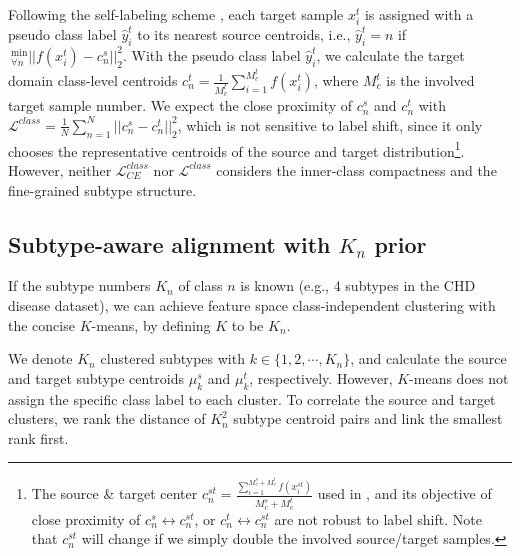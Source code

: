 Following the self-labeling scheme \cite{zou2019confidence,pan2019transferrable}, each target sample $x_i^t$ is assigned with a pseudo class label $\hat{y}_i^t$ to its nearest source centroids, i.e., $\hat{y}_i^t=n$ if $~_{\forall n}^{\text{min}}||f(x_i^t)-c_n^s||_2^2$. With the pseudo class label $\hat{y}_i^t$, we calculate the target domain class-level centroids $c_n^t=\frac{1}{M_c^t}\sum_{i=1}^{M_c^t}f(x_i^t)$, where ${M_c^t}$ is the involved target sample number. We expect the close proximity of $c_n^s$ and $c_n^t$ with $\mathcal{L}^{class}={\frac{1}{N}\sum_{n=1}^N}||c_n^s-c_n^t||_2^2$, which is not sensitive to label shift, since it only chooses the representative centroids of the source and target distribution\footnote{The source \& target center $c_n^{st}=\frac{\sum_{i=1}^{M_c^s+M_c^t}f(x_i^{st})}{M_c^s+M_c^t}$ used in \cite{pan2019transferrable}, and its objective of close proximity of $c_n^s\leftrightarrow c_n^{st}$, or $c_n^t\leftrightarrow c_n^{st}$ are not robust to label shift. Note that $c_n^{st}$ will change if we simply double the involved source/target samples.}. However, neither $\mathcal{L}_{CE}^{class}$ nor $\mathcal{L}^{class}$ considers the inner-class compactness \cite{wen2016discriminative} and the fine-grained subtype structure. 




  




\subsection{Subtype-aware alignment with $K_n$ prior} 


 
If the subtype numbers $K_n$ of class $n$ is known (e.g., 4 subtypes in the CHD disease dataset), we can achieve feature space class-independent clustering with the concise $K$-means, by defining $K$ to be $K_n$. 

 


We denote $K_n$ clustered subtypes with $k\in\{1,2,\cdots, K_n\}$, and calculate the source and target subtype centroids $\mu_k^s$ and $\mu_k^t$, respectively. However, $K$-means does not assign the specific class label to each cluster. To correlate the source and target clusters, we rank the distance of $K_n^2$ subtype centroid pairs and link the smallest rank first. %


